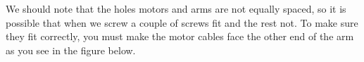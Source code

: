 \documentclass[12pt, a4paper,twoside]{tesi_upf}
\begin{document}
\noindent%
\begin{minipage}{\linewidth}
\vspace{10 mm}
\label{screwDifferences}
\end{minipage}    
\clearpage

We should note that the holes motors and arms are not equally spaced, so it is possible that when we screw a couple of screws fit and the rest not. To make sure they fit correctly, you must make the motor cables face the other end of the arm as you see in the figure below.

\noindent%
\begin{minipage}{\linewidth}
\vspace{10 mm}
\label{motorArm}
\end{minipage}    
\\[12pt]
\end{document}
